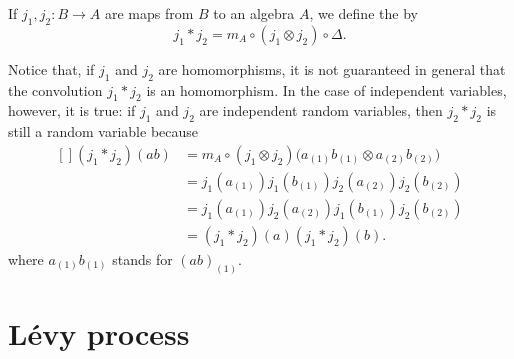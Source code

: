 If $j_1,j_2\colon B\to A$ are maps from $B$ to an algebra $A$, we define the  by
\begin{equation}
	j_1*j_2=m_A\circ(j_1\otimes j_2)\circ\Delta.
\end{equation}

Notice that, if $j_1$ and $j_2$ are homomorphisms, it is not guaranteed in general that the convolution $j_1*j_2$ is an homomorphism. In the case of independent variables, however, it is true: if $j_1$ and $j_2$ are independent random variables, then $j_2*j_2$ is still a random variable because
\begin{equation}
	\begin{aligned}[]
		(j_1*j_2)(ab) & =m_A\circ(j_1\otimes j_2)\big( a_{(1)}b_{(1)}\otimes a_{(2)}b_{(2)} \big) \\
		              & =j_1(a_{(1)})j_1(b_{(1)})j_2(a_{(2)})j_2(b_{(2)})                         \\
		              & =j_1(a_{(1)})j_2(a_{(2)})j_1(b_{(1)})j_2(b_{(2)})                         \\
		              & =(j_1*j_2)(a)(j_1*j_2)(b).
	\end{aligned}
\end{equation}
where $a_{(1)}b_{(1)}$ stands for $(ab)_{(1)}$.

\section{Lévy process}

